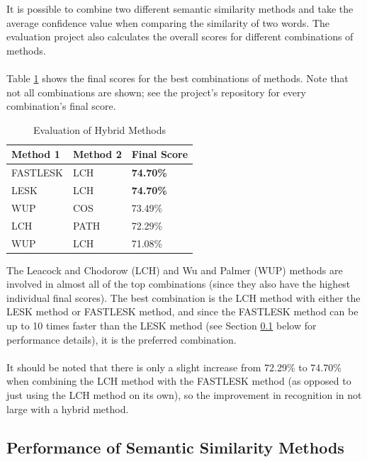 \documentclass[11pt]{article}
\begin{document}
It is possible to combine two different semantic similarity methods and take the average confidence value when comparing the similarity of two words. The evaluation project also calculates the overall scores for different combinations of methods.
\\
\\
Table \ref{table:hybrid-results} shows the final scores for the best combinations of methods. Note that not all combinations are shown; see the project's repository for every combination's final score.
\\
\begin{table}[]
\centering
\caption{Evaluation of Hybrid Methods}
\label{table:hybrid-results}
\begin{tabular}{l|l|l}
\textbf{Method 1} & \textbf{Method 2} & \textbf{Final Score} \\ \hline
FASTLESK              & LCH               & \textbf{74.70\%}     \\ \hline
LESK               & LCH               & \textbf{74.70\%}              \\ \hline
WUP               & COS              & 73.49\%              \\ \hline
LCH          & PATH               & 72.29\%              \\ \hline
WUP               & LCH          & 71.08\%            
\end{tabular}
\end{table}

The Leacock and Chodorow (LCH) and Wu and Palmer (WUP) methods are involved in almost all of the top combinations (since they also have the highest individual final scores). The best combination is the LCH method with either the LESK method or FASTLESK method, and since the FASTLESK method can be up to 10 times faster than the LESK method (see Section \ref{section:performance} below for performance details), it is the preferred combination.
\\
\\
It should be noted that there is only a slight increase from 72.29\% to 74.70\% when combining the LCH method with the FASTLESK method (as opposed to just using the LCH method on its own), so the improvement in recognition in not large with a hybrid method.

\subsection{Performance of Semantic Similarity Methods}
\label{section:performance}
\end{document}
